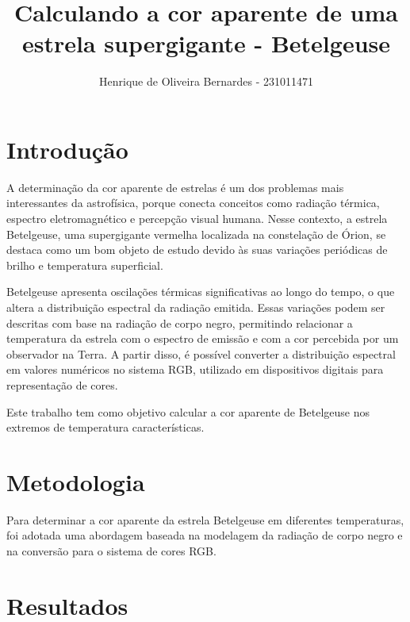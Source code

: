 \documentclass{article}
\begin{document}
\title{Calculando a cor aparente de uma estrela supergigante - Betelgeuse}
\author{Henrique de Oliveira Bernardes - 231011471}

\maketitle
\thispagestyle{fancy}
\section{Introdução}

A determinação da cor aparente de estrelas é um dos problemas mais interessantes da astrofísica, porque conecta conceitos como radiação térmica, espectro eletromagnético e percepção visual humana. Nesse contexto, a estrela Betelgeuse, uma supergigante vermelha localizada na constelação de Órion, se destaca como um bom objeto de estudo devido às suas variações periódicas de brilho e temperatura superficial.

Betelgeuse apresenta oscilações térmicas significativas ao longo do tempo, o que altera a distribuição espectral da radiação emitida. Essas variações podem ser descritas com base na radiação de corpo negro, permitindo relacionar a temperatura da estrela com o espectro de emissão e com a cor percebida por um observador na Terra. A partir disso, é possível converter a distribuição espectral em valores numéricos no sistema RGB,  utilizado em dispositivos digitais para representação de cores.

Este trabalho tem como objetivo calcular a cor aparente de Betelgeuse nos extremos de temperatura características. 

\section{Metodologia}
Para determinar a cor aparente da estrela Betelgeuse em diferentes temperaturas, foi adotada uma abordagem baseada na modelagem da radiação de corpo negro e na conversão para o sistema de cores RGB. 


\section{Resultados}
\end{document}
